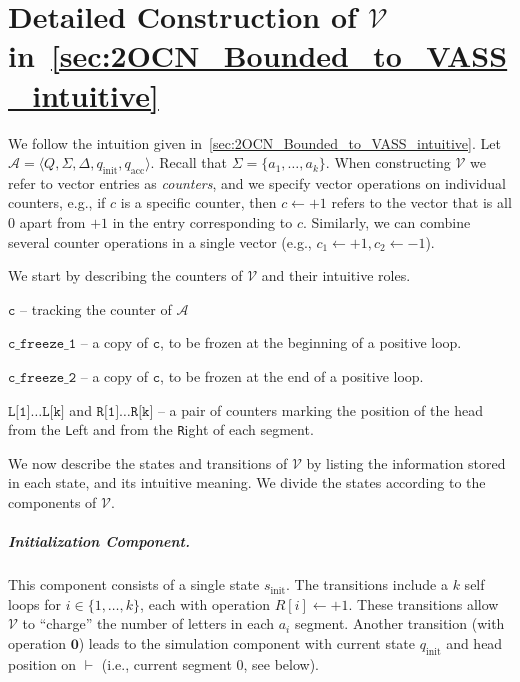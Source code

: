 \documentclass[11pt,a4paper]{amsart}
\theoremstyle{definition}
\newcommand{\tup}[1]{\langle #1 \rangle}
\newcommand{\lmark}{\vdash}
\newcommand{\initstate}{q_{\mathrm{init}}}
\newcommand{\accstate}{q_{\mathrm{acc}}}
\renewcommand{\vec}[1]{\boldsymbol{#1}}
\newcommand{\adds}[1]{\leftarrow #1}
\newcommand{\vf}[1]{\texttt{#1}}
\newcommand{\cA}{\mathcal{A}}
\newcommand{\cV}{\mathcal{V}}
\begin{document}
\newpage
\appendix
\section{Detailed Construction of $\cV$ in~\cref{sec:2OCN_Bounded_to_VASS_intuitive}}
\label{apx:2OCN_Bounded_to_VASS_formal} 
\label{sec:2OCN_Bounded_to_VASS_formal} 
We follow the intuition given in~\cref{sec:2OCN_Bounded_to_VASS_intuitive}. 
Let $\cA=\tup{Q,\Sigma,\Delta,\initstate,\accstate}$. Recall that $\Sigma=\{a_1,\ldots,a_k\}$. When
constructing $\cV$ we refer to vector entries as \emph{counters}, and we specify
vector operations on individual counters, e.g., if $c$ is a specific counter,
then $c\adds{+1}$ refers to the vector that is all $0$ apart from $+1$ in the
entry corresponding to $c$. Similarly, we can combine several counter operations
in a single vector (e.g., $c_1\adds{+1}, c_2\adds{-1}$).

We start by describing the counters of $\cV$ and their intuitive roles.
\begin{compactitem}
\item $\vf{c}$ -- tracking the counter of $\cA$
\item $\vf{c\_freeze\_1}$ -- a copy of $\vf{c}$, to be frozen at the
beginning of a positive loop.
\item $\vf{c\_freeze\_2}$ -- a copy of $\vf{c}$, to be frozen at the end of a
positive loop.
\item $\vf{L[1]}\ldots\vf{L[k]}$ and $\vf{R[1]}\ldots\vf{R[k]}$ -- a pair of counters
marking the position of the head from the \vf{L}eft and from the \vf{R}ight
of each segment.
\end{compactitem}

We now describe the states and transitions of $\cV$ by listing the information
stored in each state, and its intuitive meaning. We divide the states according
to the components of $\cV$.
\subparagraph*{Initialization Component.} This component consists of a single
state $s_{\textrm{init}}$. The transitions include a $k$ self loops for
$i\in \{1,\ldots,k\}$, each with operation $R[i]\adds{+1}$. These transitions allow
$\cV$ to ``charge'' the number of letters in each $a_i$ segment.  Another
transition (with operation $\vec{0}$) leads to the simulation component with
current state $\initstate$ and head position on $\lmark$ (i.e., current segment
$0$, see below).
\end{document}
